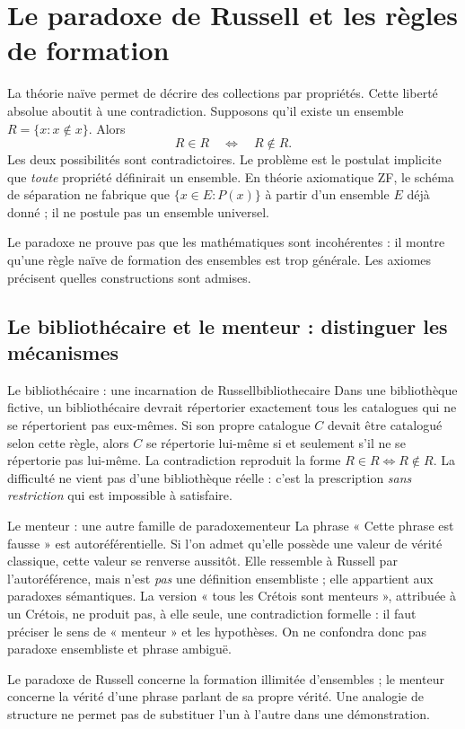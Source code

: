 \section{Le paradoxe de Russell et les règles de formation}
La théorie naïve permet de décrire des collections par propriétés. Cette liberté absolue aboutit à une contradiction. Supposons qu'il existe un ensemble $R=\{x:x\notin x\}$. Alors
\[R\in R\quad\Longleftrightarrow\quad R\notin R.\]
Les deux possibilités sont contradictoires. Le problème est le postulat implicite que \emph{toute} propriété définirait un ensemble. En théorie axiomatique ZF, le schéma de séparation ne fabrique que $\{x\in E:P(x)\}$ à partir d'un ensemble $E$ déjà donné ; il ne postule pas un ensemble universel.
\begin{retenir}
Le paradoxe ne prouve pas que les mathématiques sont incohérentes : il montre qu'une règle naïve de formation des ensembles est trop générale. Les axiomes précisent quelles constructions sont admises.
\end{retenir}


\subsection{Le bibliothécaire et le menteur : distinguer les mécanismes}
\begin{exemple}{Le bibliothécaire : une incarnation de Russell}{bibliothecaire}
Dans une bibliothèque fictive, un bibliothécaire devrait répertorier exactement tous les
catalogues qui ne se répertorient pas eux-mêmes. Si son propre catalogue $C$ devait être
catalogué selon cette règle, alors $C$ se répertorie lui-même si et seulement s'il ne se
répertorie pas lui-même. La contradiction reproduit la forme $R\in R\Leftrightarrow R\notin R$.
La difficulté ne vient pas d'une bibliothèque réelle : c'est la prescription
\emph{sans restriction} qui est impossible à satisfaire.
\end{exemple}
\begin{exemple}{Le menteur : une autre famille de paradoxe}{menteur}
La phrase « Cette phrase est fausse » est autoréférentielle. Si l'on admet qu'elle possède
une valeur de vérité classique, cette valeur se renverse aussitôt. Elle ressemble à Russell
par l'autoréférence, mais n'est \emph{pas} une définition ensembliste ; elle appartient aux
paradoxes sémantiques. La version « tous les Crétois sont menteurs », attribuée à un Crétois,
ne produit pas, à elle seule, une contradiction formelle : il faut préciser le sens de « menteur »
et les hypothèses. On ne confondra donc pas paradoxe ensembliste et phrase ambiguë.
\end{exemple}
\begin{attention}
Le paradoxe de Russell concerne la formation illimitée d'ensembles ; le menteur concerne la
vérité d'une phrase parlant de sa propre vérité. Une analogie de structure ne permet pas de
substituer l'un à l'autre dans une démonstration.
\end{attention}


